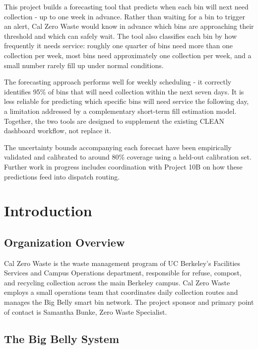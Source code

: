 \documentclass[11pt]{article}
\begin{document}
This project builds a forecasting tool that predicts when each bin will next need
collection - up to one week in advance. Rather than waiting for a bin to trigger an alert,
Cal Zero Waste would know in advance which bins are approaching their threshold and which
can safely wait. The tool also classifies each bin by how frequently it needs service:
roughly one quarter of bins need more than one collection per week, most bins need
approximately one collection per week, and a small number rarely fill up under normal
conditions.

The forecasting approach performs well for weekly scheduling - it correctly identifies 95\%
of bins that will need collection within the next seven days. It is less reliable for
predicting which specific bins will need service the following day, a limitation addressed
by a complementary short-term fill estimation model. Together, the two tools are designed
to supplement the existing CLEAN dashboard workflow, not replace it.

The uncertainty bounds accompanying each forecast have been empirically validated and
calibrated to around 80\% coverage using a held-out calibration set. Further work in progress
includes coordination with Project 10B on how these predictions feed into dispatch routing.

\newpage

\section{Introduction}

\subsection{Organization Overview}

Cal Zero Waste is the waste management program of UC Berkeley's Facilities Services and
Campus Operations department, responsible for refuse, compost, and recycling collection
across the main Berkeley campus. Cal Zero Waste employs a small operations team that
coordinates daily collection routes and manages the Big Belly smart bin network. The
project sponsor and primary point of contact is Samantha Bunke, Zero Waste Specialist.

\subsection{The Big Belly System}
\end{document}

